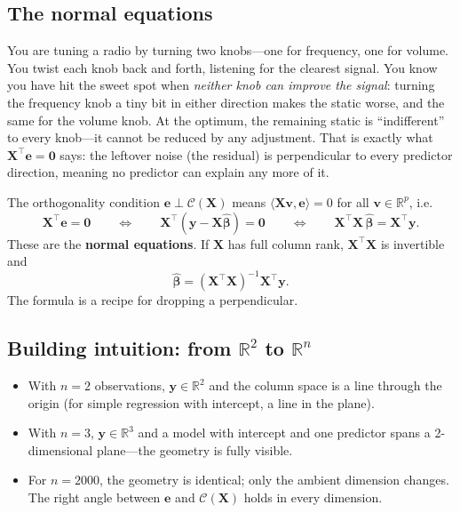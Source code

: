 \documentclass[11pt,a4paper]{article}
\theoremstyle{plain}
\theoremstyle{definition}
\newcommand{\R}{\mathbb{R}}
\newcommand{\bhat}{\hat{\bm{\beta}}}
\newcommand{\bX}{\bm{X}}
\newcommand{\by}{\bm{y}}
\newcommand{\be}{\bm{e}}
\newcommand{\Col}{\mathcal{C}}
\newcommand{\ip}[2]{\langle #1, #2 \rangle}
\begin{document}
\subsection{The normal equations}

\begin{toystory}
You are tuning a radio by turning two knobs---one for frequency, one for
volume.  You twist each knob back and forth, listening for the clearest
signal.  You know you have hit the sweet spot when \emph{neither knob
can improve the signal}: turning the frequency knob a tiny bit in either
direction makes the static worse, and the same for the volume knob.
At the optimum, the remaining static is ``indifferent'' to every
knob---it cannot be reduced by any adjustment.  That is exactly what
$\bX^\top\be = \bm{0}$ says: the leftover noise (the residual) is
perpendicular to every predictor direction, meaning no predictor can
explain any more of it.
\end{toystory}

The orthogonality condition $\be \perp \Col(\bX)$ means
$\ip{\bX\bm{v}}{\be} = 0$ for all $\bm{v}\in\R^p$, i.e.\
\[
  \bX^\top \be = \bm{0}
  \qquad\Longleftrightarrow\qquad
  \bX^\top(\by - \bX\bhat) = \bm{0}
  \qquad\Longleftrightarrow\qquad
  \boxed{\bX^\top\bX\,\bhat = \bX^\top\by.}
\]
These are the \textbf{normal equations}. If $\bX$ has full column rank,
$\bX^\top\bX$ is invertible and
\begin{equation}\label{eq:ols}
  \bhat = (\bX^\top\bX)^{-1}\bX^\top\by.
\end{equation}
The formula is a recipe for dropping a perpendicular.

\subsection{Building intuition: from $\R^2$ to $\R^n$}

\begin{itemize}[nosep]
\item With $n=2$ observations, $\by\in\R^2$ and the column space is a line
      through the origin (for simple regression with intercept, a line in the plane).
\item With $n=3$, $\by\in\R^3$ and a model with intercept and one predictor
      spans a 2-dimensional plane---the geometry is fully visible.
\item For $n=2000$, the geometry is identical; only the ambient dimension changes.
      The right angle between $\be$ and $\Col(\bX)$ holds in every dimension.
\end{itemize}
\end{document}
